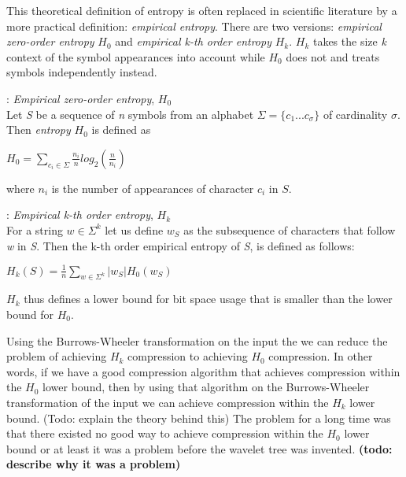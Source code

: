 This theoretical definition of entropy is often replaced in scientific literature by a more practical definition: \textit{empirical entropy}.
There are two versions: \textit{empirical zero-order entropy} $H_0$ and \textit{empirical k-th order entropy} $H_k$. $H_k$ takes the size \textit{k} context of the symbol appearances into account while $H_0$ does not and treats symbols independently instead. 

\begin{mdframed}[nobreak, linecolor=lightgray]
\begin{definition}: \textit{Empirical zero-order entropy}, $H_0$ \\
Let \textit{S} be a sequence of \textit{n} symbols from an alphabet $\Sigma = \lbrace c_1 ... c_\sigma \rbrace$ of cardinality $\sigma$.
Then \textit{entropy} $H_0$ is defined as
\begin{center}
$H_0 = \sum\limits_{c_i \in \Sigma} \frac{n_i}{n} log_2(\frac{n}{n_i})$
\end{center}
where $n_i$ is the number of appearances of character $c_i$ in $S$.
\end{definition}
\begin{definition}: \textit{Empirical k-th order entropy}, $H_k$ \\
For a string $w \in \Sigma^k$ let us define $w_S$ as the subsequence of characters that follow \textit{w} in \textit{S}. 
Then the k-th order empirical entropy of \textit{S}, is defined as follows:
\begin{center}
$H_k(S) = \frac{1}{n} \sum\limits_{w \in \Sigma^k} | w_S |H_0(w_S)$
\end{center}
\end{definition}
\end{mdframed}
$H_k$ thus defines a lower bound for bit space usage that is smaller than the lower bound for $H_0$.

Using the Burrows-Wheeler transformation on the input the we can reduce the problem of achieving $H_k$ compression to achieving $H_0$ compression.
In other words, if we have a good compression algorithm that achieves compression within the $H_0$ lower bound, then by using that algorithm on the Burrows-Wheeler transformation of the input we can achieve compression within the $H_k$ lower bound. (Todo: explain the theory behind this)
The problem for a long time was that there existed no good way to achieve compression within the $H_0$ lower bound or at least it was a problem before the wavelet tree was invented. \textbf{(todo: describe why it was a problem)} 

